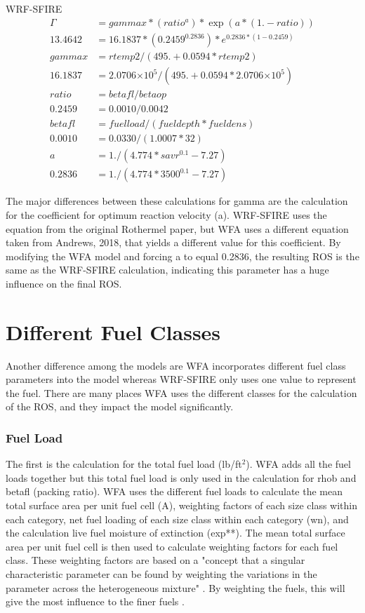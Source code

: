 \documentclass{article}
\newcommand\tenpow[1]{\ensuremath{{\times}10^{#1}}}
\newcommand\und{\textunderscore}
\begin{document}
WRF-SFIRE
\begin{equation}
\label{gamma_WRF}
	\begin{split}
		\Gamma &= gammax*(ratio^a)*\exp(a*(1.-ratio)) \\
		13.4642 &= 16.1837 * (0.2459 ^ {0.2836}) * e^{0.2836 * (1- 0.2459)} \\
		gammax &= rtemp2/(495. + 0.0594*rtemp2) \\
		16.1837 &= 2.0706 \tenpow{5} / (495. + 0.0594* 2.0706 \tenpow{5}) \\
		ratio &= betafl / betaop \\
		0.2459 &= 0.0010 / 0.0042 \\
		betafl &= fuelload/(fueldepth * fueldens) \\
		0.0010 &= 0.0330 / (1.0007 * 32) \\
		a &= 1./(4.774 * savr^{0.1} - 7.27) \\
		0.2836 &= 1./(4.774 * 3500^{0.1} - 7.27)
	\end{split}
\end{equation}
\fi

The major differences between these calculations for gamma are the calculation for the coefficient for optimum reaction velocity (a). WRF-SFIRE uses the equation from the original Rothermel paper, but WFA uses a different equation taken from Andrews, 2018, that yields a different value for this coefficient. By modifying the WFA model and forcing a to equal 0.2836, the resulting ROS is the same as the WRF-SFIRE calculation, indicating this parameter has a huge influence on the final ROS. 

\section{Different Fuel Classes}
Another difference among the models are WFA incorporates different fuel class parameters into the model whereas WRF-SFIRE only uses one value to represent the fuel. There are many places WFA uses the different classes for the calculation of the ROS, and they impact the model significantly. 

\subsubsection{Fuel Load}
 The first is the calculation for the total fuel load (lb/ft$^2$). WFA adds all the fuel loads together but this total fuel load is only used in the calculation for rhob and betafl (packing ratio). WFA uses the different fuel loads to calculate the mean total surface area per unit fuel cell (A\und *), weighting factors of each size class within each category, net fuel loading of each size class within each category (wn\und *), and the calculation live fuel moisture of extinction (exp**). The mean total surface area per unit fuel cell is then used to calculate weighting factors for each fuel class. These weighting factors are based on a "concept that a singular characteristic parameter can be found by weighting the variations in the parameter across the heterogeneous mixture" \citep{Andrews2018}. By weighting the fuels, this will give the most influence to the finer fuels \citep{Andrews2018}. 
\end{document}
